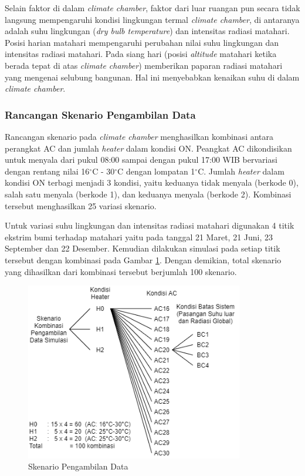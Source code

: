 Selain faktor di dalam \textit{climate chamber}, faktor dari luar ruangan pun secara tidak langsung mempengaruhi kondisi lingkungan termal \textit{climate chamber}, di antaranya adalah suhu lingkungan (\textit{dry bulb temperature}) dan intensitas radiasi matahari. Posisi harian matahari mempengaruhi perubahan nilai suhu lingkungan dan intensitas radiasi matahari. Pada siang hari (posisi \textit{altitude} matahari ketika berada tepat di atas \textit{climate chamber}) memberikan paparan radiasi matahari yang mengenai selubung bangunan. Hal ini menyebabkan kenaikan suhu di dalam \textit{climate chamber}.

\subsubsection{Rancangan Skenario Pengambilan Data}
Rancangan skenario pada \textit{climate chamber} menghasilkan kombinasi antara perangkat AC dan jumlah \textit{heater} dalam kondisi ON. Peangkat AC dikondisikan untuk menyala dari pukul 08:00 sampai dengan pukul 17:00 WIB bervariasi dengan rentang nilai 16$^\circ$C - 30$^\circ$C dengan lompatan 1$^\circ$C. Jumlah \textit{heater} dalam kondisi ON terbagi menjadi 3 kondisi, yaitu keduanya tidak menyala (berkode 0), salah satu menyala (berkode 1), dan keduanya menyala (berkode 2). Kombinasi tersebut menghasilkan 25 variasi skenario.

Untuk variasi suhu lingkungan dan intensitas radiasi matahari digunakan 4 titik ekstrim bumi terhadap matahari yaitu pada tanggal 21 Maret, 21 Juni, 23 September dan 22 Desember. Kemudian dilakukan simulasi pada setiap titik tersebut dengan kombinasi pada Gambar \ref{fig:4:SkenarioData}. Dengan demikian, total skenario yang dihasilkan dari kombinasi tersebut berjumlah 100 skenario.

\begin{figure}[!h]
	\centering
	\includegraphics[width=0.85\textwidth]{figures/SkenarioData}
	\caption{Skenario Pengambilan Data}
	\label{fig:4:SkenarioData}
\end{figure}
\vspace{1em}
\break
\break

